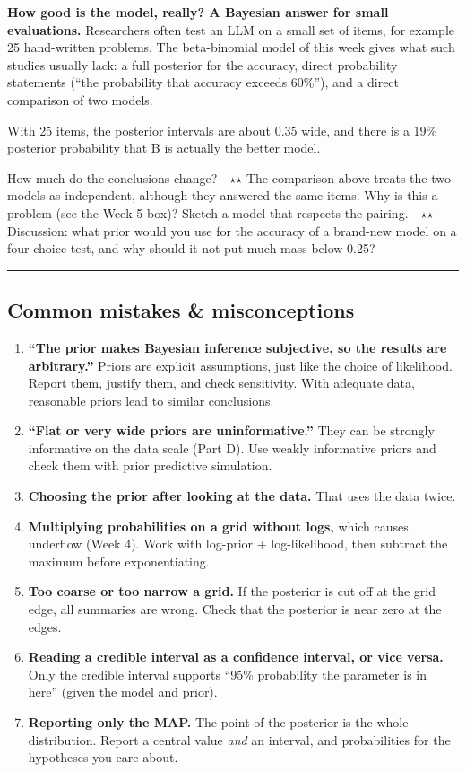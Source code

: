 \textbf{How good is the model, really? A Bayesian answer for small
evaluations.} Researchers often test an LLM on a small set of items, for
example 25 hand-written problems. The beta-binomial model of this week
gives what such studies usually lack: a full posterior for the accuracy,
direct probability statements (``the probability that accuracy exceeds
60\%''), and a direct comparison of two models.

With 25 items, the posterior intervals are about 0.35 wide, and there is
a 19\% posterior probability that B is actually the better model.

How much do the conclusions change? - \ensuremath{\star}\ensuremath{\star} The comparison above treats the
two models as independent, although they answered the same items. Why is
this a problem (see the Week 5 box)? Sketch a model that respects the
pairing. - \ensuremath{\star}\ensuremath{\star} Discussion: what prior would you use for the accuracy of a
brand-new model on a four-choice test, and why should it not put much
mass below 0.25?

\begin{center}\rule{0.5\linewidth}{0.5pt}\end{center}

\subsection{Common mistakes \& misconceptions}

\begin{enumerate}
\def\labelenumi{\arabic{enumi}.}
\tightlist
\item
  \textbf{``The prior makes Bayesian inference subjective, so the
  results are arbitrary.''} Priors are explicit assumptions, just like
  the choice of likelihood. Report them, justify them, and check
  sensitivity. With adequate data, reasonable priors lead to similar
  conclusions.
\item
  \textbf{``Flat or very wide priors are uninformative.''} They can be
  strongly informative on the data scale (Part D). Use weakly
  informative priors and check them with prior predictive simulation.
\item
  \textbf{Choosing the prior after looking at the data.} That uses the
  data twice.
\item
  \textbf{Multiplying probabilities on a grid without logs,} which
  causes underflow (Week 4). Work with log-prior + log-likelihood, then
  subtract the maximum before exponentiating.
\item
  \textbf{Too coarse or too narrow a grid.} If the posterior is cut off
  at the grid edge, all summaries are wrong. Check that the posterior is
  near zero at the edges.
\item
  \textbf{Reading a credible interval as a confidence interval, or vice
  versa.} Only the credible interval supports ``95\% probability the
  parameter is in here'' (given the model and prior).
\item
  \textbf{Reporting only the MAP.} The point of the posterior is the
  whole distribution. Report a central value \emph{and} an interval, and
  probabilities for the hypotheses you care about.
\end{enumerate}

